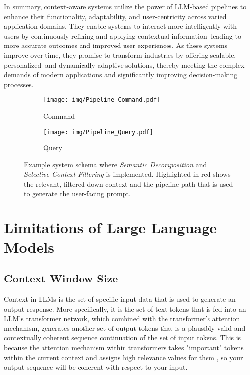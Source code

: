 In summary, context-aware systems utilize the power of LLM-based pipelines to enhance their functionality, adaptability, and user-centricity across varied application domains. They enable systems to interact more intelligently with users by continuously refining and applying contextual information, leading to more accurate outcomes and improved user experiences. As these systems improve over time, they promise to transform industries by offering scalable, personalized, and dynamically adaptive solutions, thereby meeting the complex demands of modern applications and significantly improving decision-making processes.

\begin{figure*}[t]
    \centering
    \begin{subfigure}{0.48\textwidth} %
        \centering
        \texttt{[image: img/Pipeline\_Command.pdf]}
        \caption{Command}
        \label{fig:command}
    \end{subfigure}
    \hfill
    \begin{subfigure}{0.48\textwidth} %
        \centering
        \texttt{[image: img/Pipeline\_Query.pdf]}
        \caption{Query}
        \label{fig:query}
    \end{subfigure}
    \caption{Example system schema where \textit{Semantic Decomposition} and \textit{Selective Context Filtering} is implemented. Highlighted in red shows the relevant, filtered-down context and the pipeline path that is used to generate the user-facing prompt.}
    \label{fig:system}
\end{figure*}

\section{Limitations of Large Language Models}
\subsection{Context Window Size}

Context in LLMs is the set of specific input data that is used to generate an output response. More specifically, it is the set of text tokens that is fed into an LLM's transformer network, which combined with the transformer's attention mechanism, generates another set of output tokens that is a plausibly valid and contextually coherent sequence continuation of the set of input tokens. This is because the attention mechanism within transformers takes "important" tokens within the current context and assigns high relevance values for them \cite{vaswaniAttentionAllYou2023}, so your output sequence will be coherent with respect to your input.

